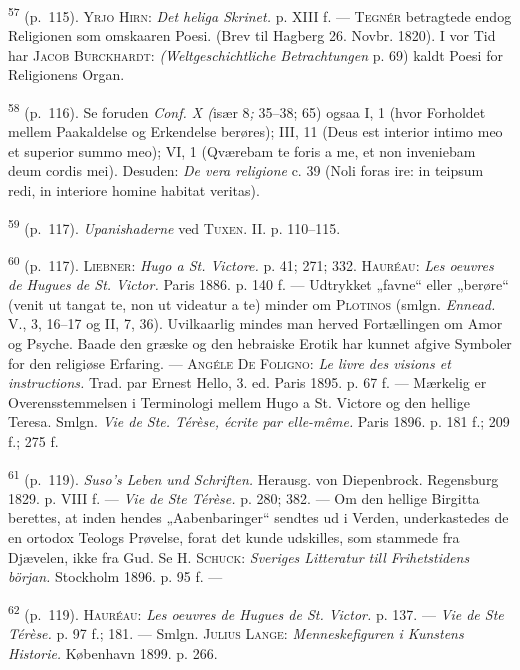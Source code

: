 \documentclass[12pt,a4paper,openany]{book}
\begin{document}
\begin{small}
\textsuperscript{57} (p.~115). \textsc{Yrjo Hirn}: \textit{Det heliga
Skrinet.} p. XIII f. ---
\textsc{Tegnér} betragtede endog Religionen som omskaaren Poesi. (Brev
til Hagberg 26. Novbr. 1820). I vor Tid har \textsc{Jacob Burckhardt}:
\textit{(Weltgeschichtliche Betrachtungen} p. 69) kaldt Poesi for
Religionens Organ.

\textsuperscript{58} (p.~116). Se foruden \textit{Conf. X (}især
8\textit{;} 35--38; 65) ogsaa I, 1
(hvor Forholdet mellem Paakaldelse og Erkendelse berøres); III, 11 (Deus
est interior intimo meo et superior summo meo); VI, 1 (Qværebam te foris
a me, et non inveniebam deum cordis mei). Desuden: \textit{De vera
religione} c. 39 (Noli foras ire: in teipsum redi, in interiore homine
habitat veritas).

\textsuperscript{59} (p.~117). \textit{Upanishaderne} ved
\textsc{Tuxen}. II. p. 110--115.

\textsuperscript{60} (p.~117). \textsc{Liebner}: \textit{Hugo a St.
Victore.} p. 41; 271; 332.
\textsc{Hauréau}: \textit{Les oeuvres de Hugues de St. Victor.} Paris
1886. p. 140 f. --- Udtrykket „favne“ eller „berøre“ (venit ut tangat
te, non ut videatur a te) minder om \textsc{Plotinos} (smlgn.
\textit{Ennead.} V., 3, 16--17 og II, 7, 36). Uvilkaarlig mindes man
herved Fortællingen om Amor og Psyche. Baade den græske og den hebraiske
Erotik har kunnet afgive Symboler for den religiøse Erfaring. ---
\textsc{Angéle De Foligno}: \textit{Le livre des visions et
instructions.} Trad. par Ernest Hello, 3. ed. Paris 1895. p. 67 f. ---
Mærkelig er Overensstemmelsen i Terminologi mellem Hugo a St. Victore og
den hellige Teresa. Smlgn. \textit{Vie de Ste. Térèse, écrite par
elle-même.} Paris 1896. p. 181 f.; 209 f.; 275 f.

\textsuperscript{61} (p.~119). \textit{Suso’s Leben und Schriften.}
Herausg. von Diepenbrock.
Regensburg 1829. p. VIII f. --- \textit{Vie de Ste Térèse.} p. 280; 382.
--- Om den hellige Birgitta berettes, at inden hendes „Aabenbaringer“
sendtes ud i Verden, underkastedes de en ortodox Teologs Prøvelse, forat
det kunde udskilles, som stammede fra Djævelen, ikke fra Gud. Se H.
\textsc{Schuck}: \textit{Sveriges Litteratur till Frihetstidens början.}
Stockholm 1896. p. 95 f. ---

\textsuperscript{62} (p.~119). \textsc{Hauréau}: \textit{Les oeuvres de
Hugues de St. Victor.} p. 137.
--- \textit{Vie de Ste Térèse.} p. 97 f.; 181. --- Smlgn. \textsc{Julius
Lange}: \textit{Menneskefiguren i Kunstens Historie.} København 1899. p.
266.


\end{small}
\end{document}
